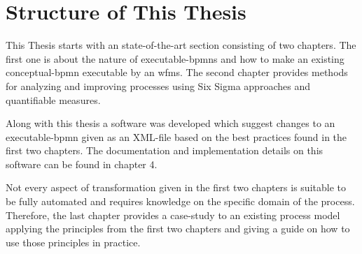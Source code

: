 \section{Structure of This Thesis}
This Thesis starts with an state-of-the-art section consisting of two chapters. The first one is about the nature of \gls{executable-bpmn}s and how to make an existing \gls{conceptual-bpmn} executable by an \gls{wfms}. The second chapter provides methods for analyzing and improving processes using Six Sigma approaches and quantifiable measures.

Along with this thesis a software was developed which suggest changes to an \gls{executable-bpmn} given as an \gls{XML}-file based on the best practices found in the first two chapters. The documentation and implementation details on this software can be found in chapter 4. 

Not every aspect of transformation given in the first two chapters is suitable to be fully automated and requires knowledge on the specific domain of the process. Therefore, the last chapter provides a case-study to an existing process model applying the principles from the first two chapters and giving a guide on how to use those principles in practice.